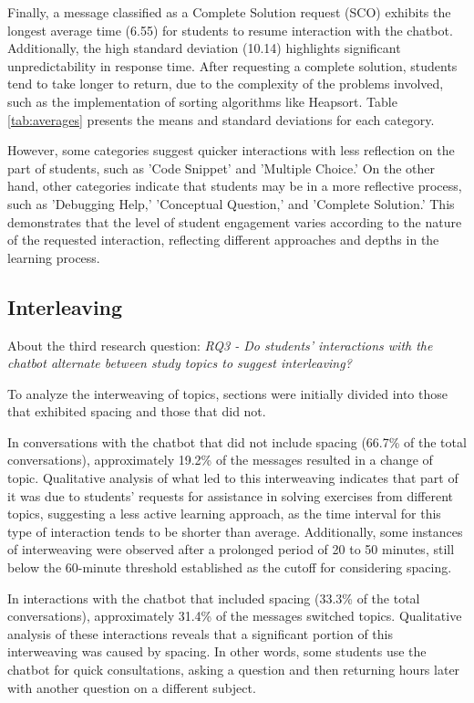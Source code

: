 \documentclass[a4paper,twoside]{article}
\begin{document}
Finally, a message classified as a Complete Solution request (SCO) exhibits the
longest average time (6.55) for students to resume interaction with the chatbot.
Additionally, the high standard deviation (10.14) highlights significant
unpredictability in response time. After requesting a complete solution,
students tend to take longer to return, due to the complexity of the problems
involved, such as the implementation of sorting algorithms like Heapsort. Table
\ref{tab:averages} presents the means and standard deviations for each
category.

However, some categories suggest quicker interactions with less reflection on
the part of students, such as 'Code Snippet' and 'Multiple Choice.' On the other
hand, other categories indicate that students may be in a more reflective
process, such as 'Debugging Help,' 'Conceptual Question,' and 'Complete
Solution.' This demonstrates that the level of student engagement varies
according to the nature of the requested interaction, reflecting different
approaches and depths in the learning process.

\subsection{Interleaving}

About the third research question: \textit{RQ3 - Do students' interactions with
the chatbot alternate between study topics to suggest interleaving?}

To analyze the interweaving of topics, sections were initially divided into
those that exhibited spacing and those that did not.

In conversations with the chatbot that did not include spacing (66.7\% of the total
conversations), approximately 19.2\% of the messages resulted in a change of
topic. Qualitative analysis of what led to this interweaving indicates that
part of it was due to students' requests for assistance in solving exercises
from different topics, suggesting a less active learning approach, as the time
interval for this type of interaction tends to be shorter than average.
Additionally, some instances of interweaving were observed after a prolonged
period of 20 to 50 minutes, still below the 60-minute threshold established as
the cutoff for considering spacing.

In interactions with the chatbot that included spacing (33.3\% of the total
conversations), approximately 31.4\% of the messages switched topics.
Qualitative analysis of these interactions reveals that a significant portion
of this interweaving was caused by spacing. In other words, some students use
the chatbot for quick consultations, asking a question and then returning hours
later with another question on a different subject.
\end{document}

